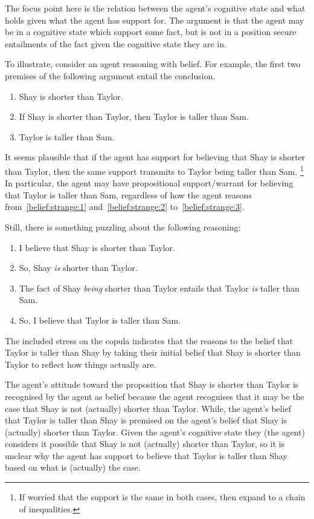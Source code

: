 \documentclass[10pt]{article}
\begin{document}
\begin{note}
  The focus point here is the relation between the agent's cognitive state and what holds given what the agent has support for.
  The argument is that the agent may be in a cognitive state which support some fact, but is not in a position secure entailments of the fact given the cognitive state they are in.
\end{note}

\begin{note}
  To illustrate, consider an agent reasoning with belief.
  For example, the first two premises of the following argument entail the conclusion.
  \begin{enumerate}
  \item\label{belief:strange:1} Shay is shorter than Taylor.
  \item\label{belief:strange:2} If Shay is shorter than Taylor, then Taylor is taller than Sam.
  \item\label{belief:strange:3} Taylor is taller than Sam.
  \end{enumerate}
  It seems plausible that if the agent has support for believing that Shay is shorter than Taylor, then the same support transmits to Taylor being taller than Sam.\nolinebreak
  \footnote{
    If worried that the support is the same in both cases, then expand to a chain of inequalities.
  }
  In particular, the agent may have propositional support/warrant for believing that Taylor is taller than Sam, regardless of how the agent reasons from~\ref{belief:strange:1} and~\ref{belief:strange:2} to~\ref{belief:strange:3}.

  Still, there is something puzzling about the following reasoning:
  \begin{enumerate}
  \item I believe that Shay is shorter than Taylor.
  \item So, Shay \emph{is} shorter than Taylor.
  \item The fact of Shay \emph{being} shorter than Taylor entails that Taylor \emph{is} taller than Sam.
  \item So, I believe that Taylor is taller than Sam.
  \end{enumerate}
  The included stress on the copula indicates that the reasons to the belief that Taylor is taller than Shay by taking their initial belief that Shay is shorter than Taylor to reflect how things actually are.

  The agent's attitude toward the proposition that Shay is shorter than Taylor is recognised by the agent as belief because the agent recognises that it may be the case that Shay is not (actually) shorter than Taylor.
  While, the agent's belief that Taylor is taller than Shay is premised on the agent's belief that Shay is (actually) shorter than Taylor.
  Given the agent's cognitive state they (the agent) considers it possible that Shay is not (actually) shorter than Taylor, so it is unclear why the agent has support to believe that Taylor is taller than Shay based on what is (actually) the case.


\end{note}
\end{document}
